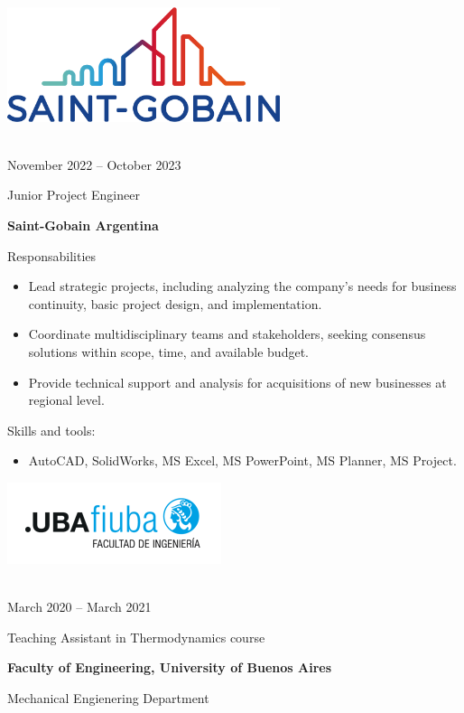 \documentclass[a4paper,10pt]{article}
\newlength{\cvcolumngapwidth}
\newlength{\cvleftcolumnwidth}
\newlength{\cvrightcolumnwidth}
\newcommand{\cvtitlestyle}[1]{{\large\cvtitlefont\textcolor{cvtitlecolor}{#1}}}
\newcommand{\cvdurationstyle}[1]{{\small\cvdurationfont\textcolor{cvdurationcolor}{#1}}}
\newlength{\cvafteritemskipamount}
\newlength{\cvaftertitleskipamount}
\newlength{\cvparskip}
\newcommand{\cvitem}[2]{
    \begin{minipage}[t]{\cvleftcolumnwidth}
        \raggedleft #1
    \end{minipage}%
    \hspace{\cvcolumngapwidth}%
    \begin{minipage}[t]{\cvrightcolumnwidth}
        \setlength{\parskip}{\cvparskip} #2
    \end{minipage}

    \vspace{\cvafteritemskipamount}
}
\newcommand{\cvtitle}[1]{
    \cvtitlestyle{#1}

    \vspace{\cvaftertitleskipamount}
    \vspace{-\cvparskip}
}
\begin{document}
\cvitem{
 	\begin{minipage}{\textwidth}
   \begin{flushright}
		  \includegraphics[width=0.6\textwidth]{../logos-photos/Logo_SG.png}   
    \end{flushright}  
  \end{minipage} \\
  \vspace{0.3cm}
  \cvdurationstyle{November 2022 -- October 2023}
}{
    \cvtitle{Junior Project Engineer}

    \textbf{\large Saint-Gobain Argentina}
	
  Responsabilities	
    \begin{itemize}
        \item Lead strategic projects, including analyzing the company's needs for business continuity, basic project
          design, and implementation.
        \item Coordinate multidisciplinary teams and stakeholders, seeking consensus solutions within scope, time, and
          available budget.
        \item Provide technical support and analysis for acquisitions of new businesses at regional level. 
    \end{itemize}
	
	Skills and tools:
	\begin{itemize}
		\item AutoCAD, SolidWorks, MS Excel, MS PowerPoint, MS Planner, MS Project.
	\end{itemize}

}

\cvitem{
 	\begin{minipage}{\textwidth}
   \begin{flushright}
		  \includegraphics[height=0.25\textwidth]{../logos-photos/Logo_FIUBA_new.png}   
    \end{flushright}  
  \end{minipage} \\
  \vspace{0.1cm}
  \cvdurationstyle{March 2020 -- March 2021}
}{
    \cvtitle{Teaching Assistant in Thermodynamics course}

    \textbf{\large Faculty of Engineering, University of Buenos Aires}

    Mechanical Engienering Department
}
\end{document}
